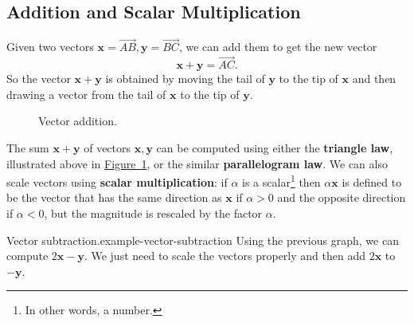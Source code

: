 \documentclass[10pt,]{book}
\newcommand{\terminology}[1]{\textbf{#1}}
\numberwithin{equation}{section}
\newcommand{\vv}[1]{\mathbf{#1}}
\begin{document}
\subsection[{Addition and Scalar Multiplication}]{Addition and Scalar Multiplication}\label{subsection-addition-and-scalar-multiplication}
\hypertarget{p-1084}{}%
Given two vectors \(\vv{x} = \overrightarrow{AB},\vv{y}=\overrightarrow{BC}\), we can add them to get the new vector%
%
\begin{equation*}
\vv{x}+\vv{y} = \overrightarrow{AC}.
\end{equation*}
\hypertarget{p-1085}{}%
So the vector \(\vv{x}+\vv{y}\) is obtained by moving the tail of \(\vv{y}\) to the tip of \(\vv{x}\) and then drawing a vector from the tail of \(\vv{x}\) to the tip of \(\vv{y}\).%
\begin{figure}
\centering
{
}
\caption{Vector addition.\label{figure-vector-addition}}
\end{figure}
\hypertarget{p-1086}{}%
The sum \(\vv{x}+\vv{y}\) of vectors \(\vv{x},\vv{y}\) can be computed using either the \terminology{triangle law}, illustrated above in \hyperref[figure-vector-addition]{Figure~\ref{figure-vector-addition}}, or the similar \terminology{parallelogram law}. We can also scale vectors using \terminology{scalar multiplication}: if \(\alpha\) is a scalar\footnote{In other words, a number.\label{fn-2}} then \(\alpha\vv{x}\) is defined to be the vector that has the same direction as \(\vv{x}\) if \(\alpha>0\) and the opposite direction if \(\alpha<0\), but the magnitude is rescaled by the factor \(\alpha\).%
\begin{example}{Vector subtraction.}{example-vector-subtraction}%
\hypertarget{p-1087}{}%
Using the previous graph, we can compute \(2\vv{x}-\vv{y}\). We just need to scale the vectors properly and then add \(2\vv{x}\) to \(-\vv{y}\).%
\end{example}
%
%
\typeout{************************************************}
\typeout{************************************************}
%
\end{document}
